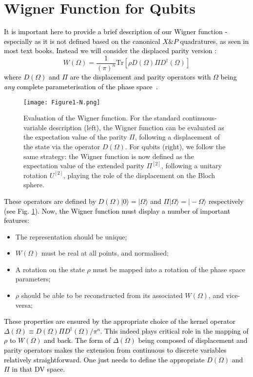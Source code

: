 \documentclass[pra,reprint,showkeys,showpacs,times,superscriptaddress]{revtex4-1}
\def\ket#1{ | #1 \rangle}
\newcommand{\red}{\textcolor{black}}
\begin{document}
\section{Wigner Function for Qubits}\label{Primer}

\red{It is important here to provide a brief description of our Wigner function - especially as it is not defined based on the canonical $X \& P$ quadratures, as seen in most text books. Instead we will consider the displaced parity version \cite{1601.07772,1605.08922,PhysRevA.15.449,PhysRevA.60.674,PhysRevLett.82.2009,PhysRevLett.105.253603,PhysRevLett.116.133601} :}
\begin{equation}
\label{Wdiff}
W(\Omega)=\frac{1}{(\pi)^n}\text{Tr}\left[\rho D(\Omega)\Pi D^\dag(\Omega)\right]
\end{equation}
\red{where $D(\Omega)$ and $\Pi$ are the displacement and parity operators with $\Omega$ being {\it any} complete parameterisation of the phase space~\cite{PhysRevA.50.4488}. }

\begin{figure}[htb]
\texttt{[image: Figure1-N.png]}
\caption{Evaluation of the Wigner function. For the standard continuous-variable description (left), the Wigner function can be evaluated as the expectation value of the parity $\Pi$, following a displacement of the state via the operator $D(\Omega)$. For qubits (right), we follow the same strategy: the Wigner function is now defined as the expectation value of the extended parity $\Pi^{[2]}$, following a unitary rotation $U^{[2]}$, playing the role of the displacement on the Bloch sphere.}
\label{figure1}
\end{figure}
\red{These operators  are defined by $D(\Omega)\ket{0}=\ket{\Omega}$ and $\Pi\ket{\Omega}=\ket{-\Omega}$ respectively (see Fig. \ref{figure1}). Now, the Wigner function must display a number of important features:}
\begin{itemize}
\item The representation should be unique;
\item $W(\Omega)$ must be real at all points, and normalised;
\item A rotation on the state $\rho$ must be mapped into a rotation of the phase space parameters;
\item  $\rho$ should be able to be reconstructed from its associated $W(\Omega)$, and vice-versa;
\end{itemize}
\red{These properties are ensured by the appropriate choice of the kernel operator $\Delta(\Omega)\equiv  D(\Omega)\Pi D^\dag(\Omega)/\pi^n$. This indeed plays critical role in the mapping of $\rho$ to $W(\Omega)$ and back. The form of $\Delta(\Omega)$ being composed of displacement and parity operators makes the extension from continuous to discrete variables relatively straightforward. One just needs to define the appropriate $D(\Omega)$ and $\Pi$ in that DV space.} 
\end{document}
